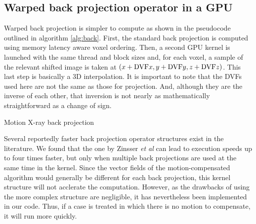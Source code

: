\subsection{Warped back projection operator in a GPU}

Warped back projection is simpler to compute as shown in the pseudocode outlined in algorithm \ref{alg:back}.  First, the standard back projection is computed using memory latency aware voxel ordering.  Then, a second GPU kernel is launched with the same thread and block sizes and, for each voxel, a sample of the relevant shifted image is taken at $(x+\textup{DVF}x,y+\textup{DVF}y,z+\textup{DVF}z)$.  This last step is basically a 3D interpolation.  It is important to note that the DVFs used here are not the same as those for projection.  And, although they are the inverse of each other, that inversion is not nearly as mathematically straightforward as a change of sign.

\begin{algorithm}

\caption{Motion X-ray back projection
\label{alg:back}}
\begin{algorithmic}[1]
    
      \Ensure{} 
      
\EndKernel{} 
\end{algorithmic}

\end{algorithm}

Several reportedly faster back projection operator structures exist in the literature.  We found that the one by Zinsser \textit{et al}\cite{zinsser2013systematic} can lead to execution speeds up to four times faster, but only when multiple back projections are used at the same time in the kernel.  Since the vector fields of the motion-compensated algorithm would generally be different for each back projection, this kernel structure will not acclerate the computation.  However, as the drawbacks of using the more complex structure are negligible, it has nevertheless been implemented in our code.  Thus, if a case is treated in which there is no motion to compensate, it will run more quickly.



